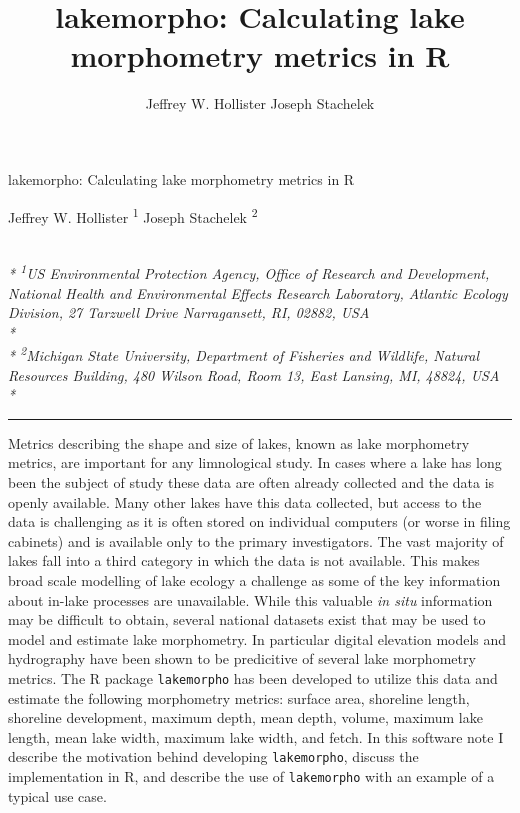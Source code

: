 \documentclass[11pt,]{article}
\title{lakemorpho: Calculating lake morphometry metrics in R}
\author{
Jeffrey W. Hollister
Joseph Stachelek
}
\date{}
\begin{document}
\begin{singlespace}
\begin{center}
\huge lakemorpho: Calculating lake morphometry metrics in R
\end{center}
\begin{center}
\large
Jeffrey W. Hollister \textsuperscript{1} 
Joseph Stachelek \textsuperscript{2} 
\end{center}
\begin{justify}
\footnotesize \emph{ 
\\*
\textsuperscript{1}US Environmental Protection Agency, Office of Research and Development,
National Health and Environmental Effects Research Laboratory, Atlantic
Ecology Division, 27 Tarzwell Drive Narragansett, RI, 02882, USA\\*
\\*
\textsuperscript{2}Michigan State University, Department of Fisheries and Wildlife, Natural
Resources Building, 480 Wilson Road, Room 13, East Lansing, MI, 48824,
USA\\*
}
\setcounter{num}{1}
\\[0.1cm]
\footnotesize \emph{ 
}
\end{justify}
\normalsize

\end{singlespace}


\singlespace

\vspace{2mm}

\hrule

Metrics describing the shape and size of lakes, known as lake
morphometry metrics, are important for any limnological study. In cases
where a lake has long been the subject of study these data are often
already collected and the data is openly available. Many other lakes
have this data collected, but access to the data is challenging as it is
often stored on individual computers (or worse in filing cabinets) and
is available only to the primary investigators. The vast majority of
lakes fall into a third category in which the data is not available.
This makes broad scale modelling of lake ecology a challenge as some of
the key information about in-lake processes are unavailable. While this
valuable \emph{in situ} information may be difficult to obtain, several
national datasets exist that may be used to model and estimate lake
morphometry. In particular digital elevation models and hydrography have
been shown to be predicitive of several lake morphometry metrics. The R
package \texttt{lakemorpho} has been developed to utilize this data and
estimate the following morphometry metrics: surface area, shoreline
length, shoreline development, maximum depth, mean depth, volume,
maximum lake length, mean lake width, maximum lake width, and fetch. In
this software note I describe the motivation behind developing
\texttt{lakemorpho}, discuss the implementation in R, and describe the
use of \texttt{lakemorpho} with an example of a typical use case.
\end{document}
